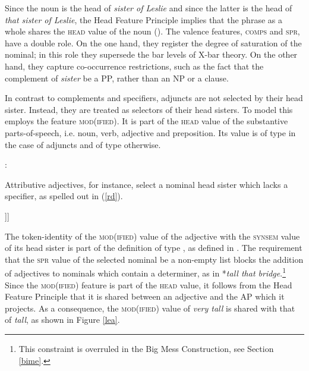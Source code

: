 \documentclass[output=paper
                ,modfonts
                ,nonflat
	        ,collection
	        ,collectionchapter
	        ,collectiontoclongg
 	        ,biblatex
                ,babelshorthands
                ,newtxmath
                ,draftmode
                ,colorlinks, citecolor=brown
]{./langsci/langscibook}
\begin{document}
Since the noun is the head of \emph{sister of Leslie} and since the latter is 
the head of \emph{that sister of Leslie}, the Head Feature Principle implies 
that the phrase as a whole shares the \textsc{head} value of the noun (). 
The valence features, \textsc{comps} and \textsc{spr}, have a double role. 
On the one hand, they register the degree of saturation of the nominal; 
in this role they supersede the bar levels of X-bar theory. 
On the other hand, they capture co-occurrence restrictions, 
such as the fact that the complement of \emph{sister} be a PP, rather than an NP or a clause.

In contrast to complements and specifiers, adjuncts are not selected by their 
head sister. Instead, they are treated as selectors of their head sisters. 
To model this \citet[55--57]{ps2} employs the feature \textsc{mod(ified)}. 
It is part of the \textsc{head} value of the substantive parts-of-speech, 
i.e. noun, verb, adjective and preposition. Its value is of type  
in the case of adjuncts and of type  otherwise.

\begin{exe} 
\ex   {}: \begin{avm} 
                          \end{avm} 
\end{exe} 

\noindent
Attributive adjectives, for instance, select a nominal head sister 
which lacks a specifier, as spelled out in (\ref{rd}). 

\begin{exe} 
\ex\label{rd}
\begin{avm}
[\type{category}                              \\
 head [\type{adjective}                       \\
       mod|loc|category [head & \type{noun}   \\
                         spr  & \type{nelist}]]]
\end{avm}
\end{exe}

\noindent
The token-identity of the \textsc{mod(ified)} value of the adjective
with the \textsc{synsem} value of its head sister is part of the 
definition of type , as defined in . 
The requirement that the \textsc{spr} value of the selected nominal be a non-empty list
blocks the addition of adjectives to nominals which contain a 
determiner, as in *\emph{tall that bridge}.\footnote{This constraint is 
overruled in the Big Mess Construction, see Section \ref{bime}.} 
Since the \textsc{mod(ified)} feature is part of the \textsc{head} value, 
it follows from the Head Feature Principle that it is shared between an adjective 
and the AP which it projects. As a consequence, the \textsc{mod(ified)} value of 
\emph{very tall} is shared with that of \emph{tall}, as shown in Figure \ref{lea}. 
\end{document}
